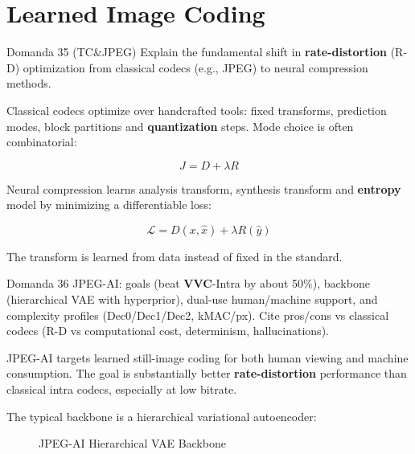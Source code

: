 \section{Learned Image Coding}




\begin{questionbox}{Domanda 35}
(TC\&JPEG) Explain the fundamental shift in \textbf{\textbf{rate}-\textbf{distortion}} (R-D) optimization from classical codecs (e.g., JPEG) to neural compression methods.
\end{questionbox}


Classical codecs optimize over handcrafted tools: fixed transforms, prediction modes, block partitions and \textbf{quantization} steps. Mode choice is often combinatorial:


$$
J = D + \lambda R
$$


Neural compression learns analysis transform, synthesis transform and \textbf{entropy} model by minimizing a differentiable loss:


$$
\mathcal{L}=D(x,\hat{x})+\lambda R(\hat{y})
$$


The transform is learned from data instead of fixed in the standard.



\begin{questionbox}{Domanda 36}
JPEG-AI: goals (beat \textbf{VVC}-Intra by about 50\%), backbone (hierarchical VAE with hyperprior), dual-use human/machine support, and complexity profiles (Dec0/Dec1/Dec2, kMAC/px). Cite pros/cons vs classical codecs (R-D vs computational cost, determinism, hallucinations).
\end{questionbox}


JPEG-AI targets learned still-image coding for both human viewing and machine consumption. The goal is substantially better \textbf{\textbf{rate}-\textbf{distortion}} performance than classical intra codecs, especially at low bitrate.

The typical backbone is a hierarchical variational autoencoder:


\begin{figure}[H]
\centering
{}
\caption{JPEG-AI Hierarchical VAE Backbone}
\end{figure}


